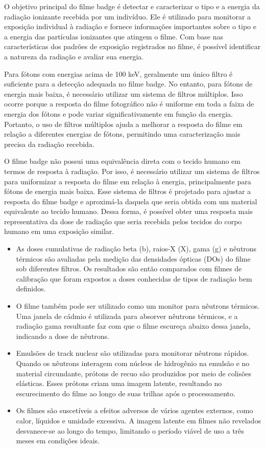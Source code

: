 \documentclass[11pt,a4paper]{article}
\newcounter{exemplo}
\begin{document}
	O objetivo principal do filme badge é detectar e caracterizar o tipo e a energia da radiação ionizante recebida por um indivíduo. Ele é utilizado para monitorar a exposição individual à radiação e fornece informações importantes sobre o tipo e a energia das partículas ionizantes que atingem o filme. Com base nas características dos padrões de exposição registrados no filme, é possível identificar a natureza da radiação e avaliar sua energia.

	Para fótons com energias acima de 100 keV, geralmente um único filtro é suficiente para a detecção adequada no filme badge. No entanto, para fótons de energia mais baixa, é necessário utilizar um sistema de filtros múltiplos. Isso ocorre porque a resposta do filme fotográfico não é uniforme em toda a faixa de energia dos fótons e pode variar significativamente em função da energia. Portanto, o uso de filtros múltiplos ajuda a melhorar a resposta do filme em relação a diferentes energias de fótons, permitindo uma caracterização mais precisa da radiação recebida.

	O filme badge não possui uma equivalência direta com o tecido humano em termos de resposta à radiação. Por isso, é necessário utilizar um sistema de filtros para uniformizar a resposta do filme em relação à energia, principalmente para fótons de energia mais baixa. Esse sistema de filtros é projetado para ajustar a resposta do filme badge e aproximá-la daquela que seria obtida com um material equivalente ao tecido humano. Dessa forma, é possível obter uma resposta mais representativa da dose de radiação que seria recebida pelos tecidos do corpo humano em uma exposição similar.

	\begin{exemplo}
		\begin{itemize}
			\item As doses cumulativas de radiação beta (b), raios-X (X), gama (g) e nêutrons térmicos são avaliadas pela medição das densidades ópticas (DOs) do filme sob diferentes filtros. Os resultados são então comparados com filmes de calibração que foram expostos a doses conhecidas de tipos de radiação bem definidos.
			\item O filme também pode ser utilizado como um monitor para nêutrons térmicos. Uma janela de cádmio é utilizada para absorver nêutrons térmicos, e a radiação gama resultante faz com que o filme escureça abaixo dessa janela, indicando a dose de nêutrons.
			\item Emulsões de track nuclear são utilizadas para monitorar nêutrons rápidos. Quando os nêutrons interagem com núcleos de hidrogênio na emulsão e no material circundante, prótons de recuo são produzidos por meio de colisões elásticas. Esses prótons criam uma imagem latente, resultando no escurecimento do filme ao longo de suas trilhas após o processamento.
			\item Os filmes são suscetíveis a efeitos adversos de vários agentes externos, como calor, líquidos e umidade excessiva. A imagem latente em filmes não revelados desvanece-se ao longo do tempo, limitando o período viável de uso a três meses em condições ideais.
		\end{itemize}
	\end{exemplo}
\end{document}
